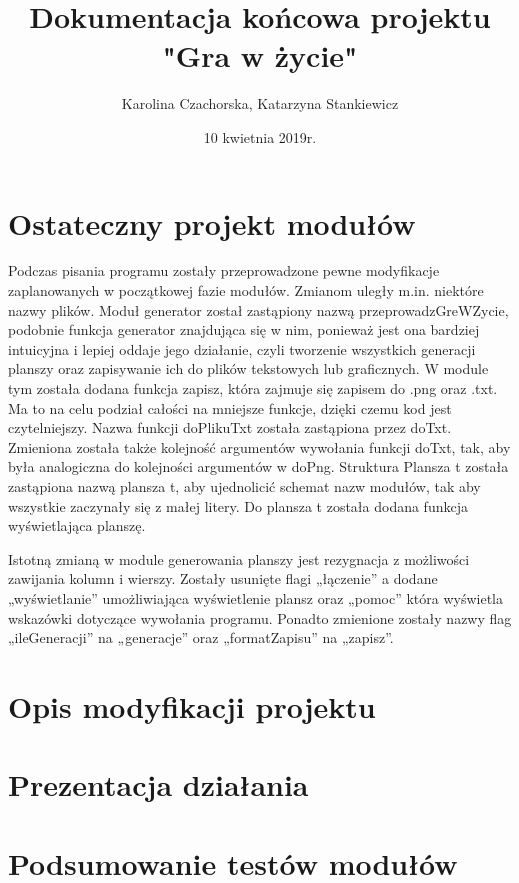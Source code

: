 \documentclass[10pt, oneside]{article}
\title{Dokumentacja końcowa projektu "Gra w życie"}
\author{Karolina Czachorska, Katarzyna Stankiewicz}
\date{10 kwietnia 2019r.}
\begin{document}
\maketitle
\tableofcontents
\newpage	
\section{Ostateczny projekt modułów}
Podczas pisania programu zostały przeprowadzone pewne modyfikacje zaplanowanych w początkowej fazie modułów.
Zmianom uległy m.in. niektóre nazwy plików. 
Moduł generator został zastąpiony nazwą przeprowadzGreWZycie, podobnie funkcja generator znajdująca się w nim, ponieważ jest ona bardziej intuicyjna i lepiej oddaje jego działanie, czyli tworzenie wszystkich generacji planszy oraz zapisywanie ich do plików tekstowych lub graficznych. W module tym została dodana funkcja zapisz, która zajmuje się zapisem do .png oraz .txt. Ma to na celu podział całości na mniejsze funkcje, dzięki czemu kod jest czytelniejszy. Nazwa funkcji doPlikuTxt została zastąpiona przez doTxt. Zmieniona została także kolejność argumentów wywołania funkcji doTxt, tak, aby była analogiczna do kolejności argumentów w doPng. Struktura Plansza t została zastąpiona nazwą plansza t, aby ujednolicić schemat nazw modułów, tak aby wszystkie zaczynały się z małej litery. Do plansza t została dodana funkcja wyświetlająca planszę. 
	 
Istotną zmianą w module generowania planszy jest rezygnacja z możliwości zawijania kolumn i wierszy. 
Zostały usunięte flagi „łączenie” a dodane „wyświetlanie” umożliwiająca wyświetlenie plansz oraz „pomoc” która wyświetla wskazówki dotyczące wywołania programu. Ponadto zmienione zostały nazwy flag „ileGeneracji” na „generacje” oraz „formatZapisu” na „zapisz”.

\section{Opis modyfikacji projektu}

\section{Prezentacja działania}

\section{Podsumowanie testów modułów}
\end{document}
